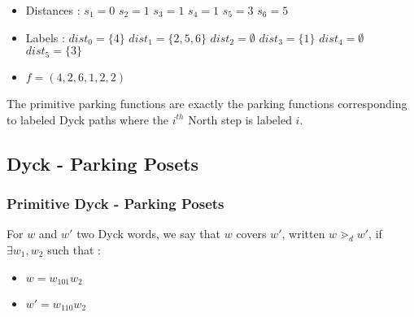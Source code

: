 \begin{example}[$n = 6, \mathcal{LD}_n \to \mathcal{PF}_n$]
\begin{center}
    \end{center}

    \begin{itemize}
        \item Distances :
            \subitem $s_1 = 0$
            \hspace{2cm} $s_2 = 1$
            \hspace{2cm} $s_3 = 1$
            \subitem $s_4 = 1$
            \hspace{2cm} $s_5 = 3$
            \hspace{2cm} $s_6 = 5$
        \item Labels :
            \subitem $dist_0 = \{4\}$
            \hspace{2cm} $dist_1 = \{2, 5, 6\}$
            \hspace{2cm} $dist_2 = \emptyset$
            \subitem $dist_3 = \{1\}$
            \hspace{2cm} $dist_4 = \emptyset$
            \hspace{32mm} $dist_5 = \{3\}$
        \item $f = (4, 2, 6, 1, 2, 2)$
    \end{itemize}
\end{example}

\begin{rem}
    The primitive parking functions are exactly the
    parking functions corresponding to labeled Dyck paths
    where the $i^{th}$ North step is labeled $i$.
\end{rem}

\subsection{Dyck - Parking Posets}

\subsubsection{Primitive Dyck - Parking Posets}

\begin{definition}[$\gtrdot_d$]
    For $w$ and $w'$ two Dyck words, we say that $w$
    covers $w'$, written $w \gtrdot_d w'$, if
    $\exists w_1, w_2$ such that :
    \begin{itemize}
        \item $w = w_101w_2$
        \item $w' = w_110w_2$
    \end{itemize}  
\end{definition}

